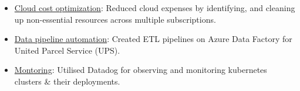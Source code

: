 \documentclass[11pt,a4paper]{article}
\newenvironment{dashlist}{
  \begin{itemize}[label={--}]
}{
  \end{itemize}
}
\begin{document}
\begin{dashlist}
    \item \uline {Cloud cost optimization}: Reduced cloud expenses by identifying, and cleaning up non-essential resources across multiple subscriptions.
    \item \uline {Data pipeline automation}: Created ETL pipelines on Azure Data Factory for United Parcel Service (UPS).
    \item \uline {Montoring}: Utilised Datadog for observing and monitoring kubernetes clusters \& their deployments.
\end{dashlist}

\medskip

\end{document}
